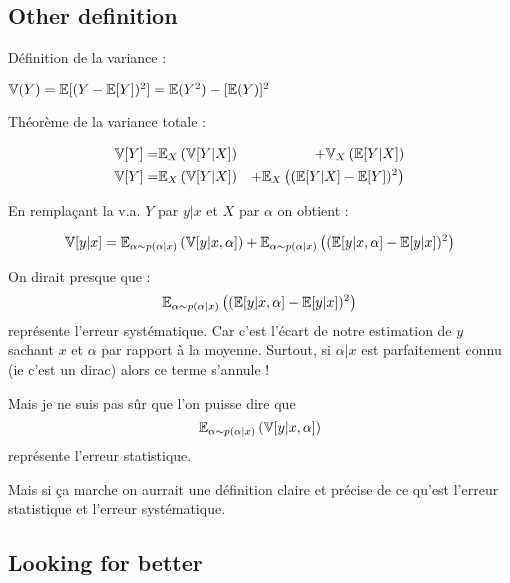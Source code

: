 



\subsection{Other definition} %
\label{sub:other_definition}

Définition de la variance :

$\mathbb{V}(Y) = \mathbb{E}[(Y - \mathbb{E}[Y])^2] = \mathbb{E}(Y^2) - [\mathbb{E}(Y)]^2$

Théorème de la variance totale \needcite :

\begin{eqnarray}
    \mathbb{V}[Y] =& \mathbb{E}_X \left (\mathbb{V}[Y|X] \right ) &+ \mathbb{V}_X \left (\mathbb{E}[Y|X]\right ) \\
    \mathbb{V}[Y] =& \mathbb{E}_X \left (\mathbb{V}[Y|X] \right ) &+ \mathbb{E}_X \left ( (\mathbb{E} [Y|X]  - \mathbb{E}[Y])^2\right )
\end{eqnarray}


En remplaçant la v.a. $Y$ par $y|x$ et $X$ par $\alpha$ on obtient :

$$
\mathbb{V}[y|x] = \mathbb{E}_{\alpha \sim p(\alpha|x)} \left (\mathbb{V}[y|x, \alpha] \right ) + \mathbb{E}_{\alpha \sim p(\alpha|x)} \left ( (\mathbb{E} [y|x, \alpha]  - \mathbb{E}[y|x])^2\right )
$$


On dirait presque que : 
$$\mathbb{E}_{\alpha \sim p(\alpha|x)} \left ((\mathbb{E} [y|x, \alpha]  - \mathbb{E}[y|x])^2\right )$$
représente l'erreur systématique. 
Car c'est l'écart de notre estimation de $y$ sachant $x$ et $\alpha$ par rapport à la moyenne.
Surtout, si $\alpha|x$ est parfaitement connu (ie c'est un dirac) alors ce terme s'annule !

Mais je ne suis pas sûr que l'on puisse dire que
$$\mathbb{E}_{\alpha \sim p(\alpha|x)} \left (\mathbb{V}[y|x, \alpha] \right )$$
représente l'erreur statistique.

Mais si ça marche on aurrait une définition claire et précise de ce qu'est l'erreur statistique et l'erreur systématique.





\subsection{Looking for better} %
\label{sub:looking_for_better}




